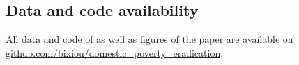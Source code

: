   \begin{small} %





\section*{\normalsize Data and code availability}

All data and code of as well as figures of the paper are available on \href{https://github.com/bixiou/domestic_poverty_eradication}{github.com/bixiou/domestic\_poverty\_eradication}. 

\end{small}  %

\renewcommand{\url}[1]{\href{#1}{Link}} %


\appendix %
\renewcommand{\thetable}{A\arabic{table}}
\renewcommand{\thefigure}{A\arabic{figure}}
\setcounter{figure}{0}
\setcounter{table}{0}

%  

